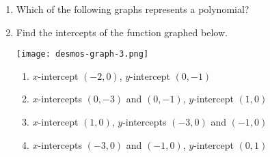 \documentclass{article}
\begin{document}
\begin{enumerate}
   \item Which of the following graphs represents a polynomial?
  \begin{enumerate}
  \end{enumerate}

\item Find the intercepts of the function graphed below.

\texttt{[image: desmos-graph-3.png]} 
  \begin{enumerate}  
  \item \(x\text{-}\)intercept \((-2,0)\), \(y\text{-}\)intercept \((0,-1)\) 
  \item \(x\text{-}\)intercepts \((0,-3)\) and \((0,-1)\), \(y\text{-}\)intercept \((1,0)\) 
  \item \(x\text{-}\)intercept \((1,0)\), \(y\text{-}\)intercepts \((-3,0)\) and \((-1,0)\)
  \item \(x\text{-}\)intercepts \((-3,0)\) and \((-1,0)\), \(y\text{-}\)intercept \((0,1)\)  %
  \end{enumerate}



\end{enumerate}
\end{document}
